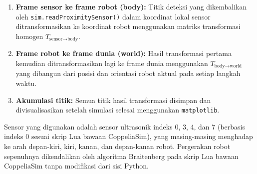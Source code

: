 \documentclass{article}
\begin{document}
\begin{enumerate}
    \item \textbf{Frame sensor ke frame robot (body):} Titik deteksi yang dikembalikan oleh
          \texttt{sim.readProximitySensor()} dalam koordinat lokal sensor
          ditransformasikan ke koordinat robot menggunakan matriks transformasi homogen
          $T_{\text{sensor} \to \text{body}}$.

    \item \textbf{Frame robot ke frame dunia (world):} Hasil transformasi pertama kemudian
          ditransformasikan lagi ke frame dunia menggunakan $T_{\text{body} \to \text{world}}$
          yang dibangun dari posisi dan orientasi robot aktual pada setiap langkah waktu.

    \item \textbf{Akumulasi titik:} Semua titik hasil transformasi disimpan dan divisualisasikan
          setelah simulasi selesai menggunakan \texttt{matplotlib}.
\end{enumerate}

Sensor yang digunakan adalah sensor ultrasonik indeks 0, 3, 4, dan 7 (berbasis indeks 0
sesuai skrip Lua bawaan CoppeliaSim), yang masing-masing menghadap ke arah depan-kiri, kiri,
kanan, dan depan-kanan robot. Pergerakan robot sepenuhnya dikendalikan oleh algoritma
Braitenberg pada skrip Lua bawaan CoppeliaSim tanpa modifikasi dari sisi Python.
\end{document}
